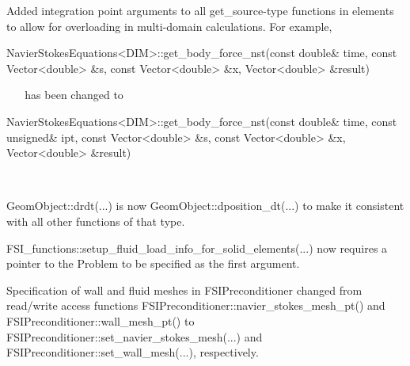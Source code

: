 \begin{DoxyItemize}
\item Added integration point arguments to all get\+\_\+source-\/type functions in elements to allow for overloading in multi-\/domain calculations. For example, ~\newline
~\newline

\begin{DoxyCode}
NavierStokesEquations<DIM>::get\_body\_force\_nst(\textcolor{keyword}{const} \textcolor{keywordtype}{double}& time,
                                               \textcolor{keyword}{const} Vector<double> &s,
                                               \textcolor{keyword}{const} Vector<double> &x,
                                               Vector<double> &result)
\end{DoxyCode}
 ~\newline
~\newline
 has been changed to ~\newline
~\newline

\begin{DoxyCode}
NavierStokesEquations<DIM>::get\_body\_force\_nst(\textcolor{keyword}{const} \textcolor{keywordtype}{double}& time,
                                               \textcolor{keyword}{const} \textcolor{keywordtype}{unsigned}& ipt,
                                               \textcolor{keyword}{const} Vector<double> &s,
                                               \textcolor{keyword}{const} Vector<double> &x,
                                               Vector<double> &result)
\end{DoxyCode}
 ~\newline
~\newline

\item {\ttfamily Geom\+Object\+::drdt}(...) is now {\ttfamily Geom\+Object\+::dposition\+\_\+dt}(...) to make it consistent with all other functions of that type. ~\newline
~\newline

\item {\ttfamily F\+S\+I\+\_\+functions\+::setup\+\_\+fluid\+\_\+load\+\_\+info\+\_\+for\+\_\+solid\+\_\+elements}(...) now requires a pointer to the {\ttfamily Problem} to be specified as the first argument. ~\newline
~\newline

\item Specification of wall and fluid meshes in {\ttfamily F\+S\+I\+Preconditioner} changed from read/write access functions {\ttfamily F\+S\+I\+Preconditioner\+::navier\+\_\+stokes\+\_\+mesh\+\_\+pt()} and {\ttfamily F\+S\+I\+Preconditioner\+::wall\+\_\+mesh\+\_\+pt()} to {\ttfamily F\+S\+I\+Preconditioner\+::set\+\_\+navier\+\_\+stokes\+\_\+mesh}(...) and {\ttfamily F\+S\+I\+Preconditioner\+::set\+\_\+wall\+\_\+mesh}(...), respectively. ~\newline
~\newline


\end{DoxyItemize}
